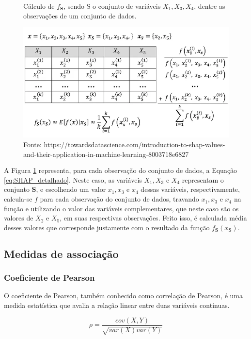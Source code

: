 \begin{figure}[H]
    \centering
    \caption{Cálculo de $f_{\textbf{S}}$, sendo S o conjunto de variáveis $X_1, X_3, X_4$, dentre as observações de um conjunto de dados.}
    \includegraphics[scale=0.5]{imagens/shap_explicado.png}
    \caption*{Fonte: https://towardsdatascience.com/introduction-to-shap-values-and-their-application-in-machine-learning-8003718e6827}
    \label{fig:calculo_esforço}

    
\end{figure}
A Figura \ref{fig:calculo_esforço} representa, para cada observação do conjunto de dados, a Equação \ref{eq:SHAP_detalhado}. Neste caso, as variáveis $X_1, X_3$ e $ X_4$ representam o conjunto $\textbf{S}$, e escolhendo um valor $x_1, x_3$ e $ x_4$ dessas variáveis, respectivamente, calcula-se $f$ para cada observação do conjunto de dados, travando $x_1, x_3$ e $ x_4$ na função e utilizando o valor das variáveis complementares, que neste caso são os valores de $X_2$ e $X_5$, em suas respectivas observações. Feito isso, é calculada média desses valores que corresponde justamente com o resultado da função $f_{\textbf{S}}(x_{\textbf{S}})$.


\subsection{Medidas de associação}

\subsubsection{Coeficiente de Pearson}

O coeficiente de Pearson, também conhecido como correlação de Pearson, é uma medida estatística 
que avalia a relação linear entre duas variáveis contínuas.

\begin{equation}
    \rho = \frac{cov(X, Y)}{\sqrt{var(X)var(Y)}}
\end{equation}

